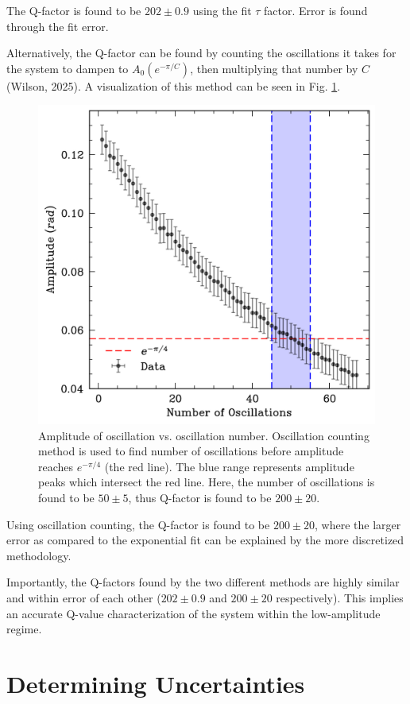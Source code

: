 \documentclass[prl,twocolumn,amsmath,amssymb,superscriptaddress]{revtex4-2}
\begin{document}
The Q-factor is found to be $202\pm0.9$ using the fit $\tau$ factor. Error is found through the fit error.

Alternatively, the Q-factor can be found by counting the oscillations it takes for the system to dampen to $A_0(e^{-\pi/C})$, then multiplying that number by $C$ (Wilson, 2025). A visualization of this method can be seen in Fig. \ref{fig:count_q}.

\begin{figure}[htb]
    \hspace{-20pt}
    \includegraphics[width=0.8\linewidth]{count_decay.png}
    \caption{Amplitude of oscillation vs. oscillation number. Oscillation counting method is used to find number of oscillations before amplitude reaches $e^{-\pi/4}$ (the red line). The blue range represents amplitude peaks which intersect the red line. Here, the number of oscillations is found to be $50\pm5$, thus Q-factor is found to be $200\pm20$.}
    \label{fig:count_q}
\end{figure}

Using oscillation counting, the Q-factor is found to be $200\pm20$, where the larger error as compared to the exponential fit can be explained by the more discretized methodology.

Importantly, the Q-factors found by the two different methods are highly similar and within error of each other ($202\pm0.9$ and $200\pm20$ respectively). This implies an accurate Q-value characterization of the system within the low-amplitude regime.

\vspace{60pt}
\section{Determining Uncertainties}
\end{document}
